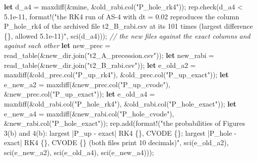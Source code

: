 \documentclass[
  10pt,
]{article}
\newenvironment{Shaded}{}{}
\newcommand{\CommentTok}[1]{\textcolor[rgb]{0.38,0.63,0.69}{\textit{#1}}}
\newcommand{\DecValTok}[1]{\textcolor[rgb]{0.25,0.63,0.44}{#1}}
\newcommand{\KeywordTok}[1]{\textcolor[rgb]{0.00,0.44,0.13}{\textbf{#1}}}
\newcommand{\NormalTok}[1]{#1}
\newcommand{\OperatorTok}[1]{\textcolor[rgb]{0.40,0.40,0.40}{#1}}
\newcommand{\PreprocessorTok}[1]{\textcolor[rgb]{0.74,0.48,0.00}{#1}}
\newcommand{\StringTok}[1]{\textcolor[rgb]{0.25,0.44,0.63}{#1}}
\begin{document}
\begin{Shaded}
\begin{Highlighting}[]
    \KeywordTok{let}\NormalTok{ d\_a4 }\OperatorTok{=}\NormalTok{ maxdiff(}\OperatorTok{\&}\NormalTok{mine}\OperatorTok{,} \OperatorTok{\&}\NormalTok{old\_rabi}\OperatorTok{.}\NormalTok{col(}\StringTok{"P\_hole\_rk4"}\NormalTok{))}\OperatorTok{;}
\NormalTok{    rep}\OperatorTok{.}\NormalTok{check(d\_a4 }\OperatorTok{\textless{}} \DecValTok{5.1e{-}11}\OperatorTok{,} \PreprocessorTok{format!}\NormalTok{(}\StringTok{"the RK4 run of AS{-}4 with dt = 0.02 reproduces the column P\_hole\_rk4 of the archived file t2\_B\_rabi.csv at its 101 times (largest difference \{\}, allowed 5.1e{-}11)"}\OperatorTok{,}\NormalTok{ sci(d\_a4)))}\OperatorTok{;}
    \CommentTok{// the new files against the exact columns and against each other}
    \KeywordTok{let}\NormalTok{ new\_prec }\OperatorTok{=}\NormalTok{ read\_table(}\OperatorTok{\&}\NormalTok{new\_dir}\OperatorTok{.}\NormalTok{join(}\StringTok{"t2\_A\_precession.csv"}\NormalTok{))}\OperatorTok{;}
    \KeywordTok{let}\NormalTok{ new\_rabi }\OperatorTok{=}\NormalTok{ read\_table(}\OperatorTok{\&}\NormalTok{new\_dir}\OperatorTok{.}\NormalTok{join(}\StringTok{"t2\_B\_rabi.csv"}\NormalTok{))}\OperatorTok{;}
    \KeywordTok{let}\NormalTok{ e\_old\_a2 }\OperatorTok{=}\NormalTok{ maxdiff(}\OperatorTok{\&}\NormalTok{old\_prec}\OperatorTok{.}\NormalTok{col(}\StringTok{"P\_up\_rk4"}\NormalTok{)}\OperatorTok{,} \OperatorTok{\&}\NormalTok{old\_prec}\OperatorTok{.}\NormalTok{col(}\StringTok{"P\_up\_exact"}\NormalTok{))}\OperatorTok{;}
    \KeywordTok{let}\NormalTok{ e\_new\_a2 }\OperatorTok{=}\NormalTok{ maxdiff(}\OperatorTok{\&}\NormalTok{new\_prec}\OperatorTok{.}\NormalTok{col(}\StringTok{"P\_up\_cvode"}\NormalTok{)}\OperatorTok{,} \OperatorTok{\&}\NormalTok{new\_prec}\OperatorTok{.}\NormalTok{col(}\StringTok{"P\_up\_exact"}\NormalTok{))}\OperatorTok{;}
    \KeywordTok{let}\NormalTok{ e\_old\_a4 }\OperatorTok{=}\NormalTok{ maxdiff(}\OperatorTok{\&}\NormalTok{old\_rabi}\OperatorTok{.}\NormalTok{col(}\StringTok{"P\_hole\_rk4"}\NormalTok{)}\OperatorTok{,} \OperatorTok{\&}\NormalTok{old\_rabi}\OperatorTok{.}\NormalTok{col(}\StringTok{"P\_hole\_exact"}\NormalTok{))}\OperatorTok{;}
    \KeywordTok{let}\NormalTok{ e\_new\_a4 }\OperatorTok{=}\NormalTok{ maxdiff(}\OperatorTok{\&}\NormalTok{new\_rabi}\OperatorTok{.}\NormalTok{col(}\StringTok{"P\_hole\_cvode"}\NormalTok{)}\OperatorTok{,} \OperatorTok{\&}\NormalTok{new\_rabi}\OperatorTok{.}\NormalTok{col(}\StringTok{"P\_hole\_exact"}\NormalTok{))}\OperatorTok{;}
\NormalTok{    rep}\OperatorTok{.}\NormalTok{add(}\PreprocessorTok{format!}\NormalTok{(}\StringTok{"the probabilities of Figures 3(b) and 4(b): largest |P\_up {-} exact| RK4 \{\}, CVODE \{\}; largest |P\_hole {-} exact| RK4 \{\}, CVODE \{\} (both files print 10 decimals)"}\OperatorTok{,}\NormalTok{ sci(e\_old\_a2)}\OperatorTok{,}\NormalTok{ sci(e\_new\_a2)}\OperatorTok{,}\NormalTok{ sci(e\_old\_a4)}\OperatorTok{,}\NormalTok{ sci(e\_new\_a4)))}\OperatorTok{;}

\end{Highlighting}
\end{Shaded}
\end{document}
